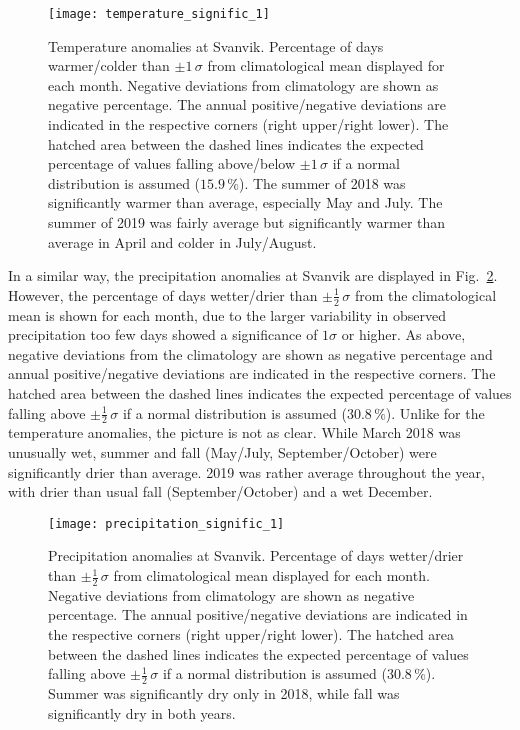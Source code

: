 \documentclass[bg, manuscript]{copernicus}
\begin{document}
\begin{figure}[t]
  \texttt{[image: temperature\_signific\_1]}
  \caption{Temperature anomalies at Svanvik. Percentage of days warmer/colder than $\pm 1\,\sigma$ from climatological mean displayed for each month. Negative deviations from climatology are shown as negative percentage. The annual positive/negative deviations are indicated in the respective corners (right upper/right lower). The hatched area between the dashed lines indicates the expected percentage of values falling above/below $\pm 1\,\sigma$ if a normal distribution is assumed ($15.9\,\unit{\%}$). The summer of 2018 was significantly warmer than average, especially May and July. The summer of 2019 was fairly average but significantly warmer than average in April and colder in July/August.}
  \label{fig:plot_temperature_anomalies_svanvik}
\end{figure}

In a similar way, the precipitation anomalies at Svanvik are displayed in Fig.~\ref{fig:plot_precipitation_anomalies_svanvik}. However, the percentage of days wetter/drier than $\pm \frac{1}{2}\,\sigma$ from the climatological mean is shown for each month, due to the larger variability in observed precipitation too few days showed a significance of $1 \sigma$ or higher. As above, negative deviations from the climatology are shown as negative percentage and annual positive/negative deviations are indicated in the respective corners. The hatched area between the dashed lines indicates the expected percentage of values falling above $\pm\frac{1}{2}\,\sigma$ if a normal distribution is assumed ($30.8\,\unit{\%}$). Unlike for the temperature anomalies, the picture is not as clear. While March 2018 was unusually wet, summer and fall (May/July, September/October) were significantly drier than average. 2019 was rather average throughout the year, with drier than usual fall (September/October) and a wet December.

\begin{figure}[t]
  \texttt{[image: precipitation\_signific\_1]}
  \caption{Precipitation anomalies at Svanvik. Percentage of days wetter/drier than $\pm \frac{1}{2}\,\sigma$ from climatological mean displayed for each month. Negative deviations from climatology are shown as negative percentage. The annual positive/negative deviations are indicated in the respective corners (right upper/right lower). The hatched area between the dashed lines indicates the expected percentage of values falling above $\pm\frac{1}{2}\,\sigma$ if a normal distribution is assumed ($30.8\,\unit{\%}$). Summer was significantly dry only in 2018, while fall was significantly dry in both years.}
  \label{fig:plot_precipitation_anomalies_svanvik}
\end{figure}
\end{document}
